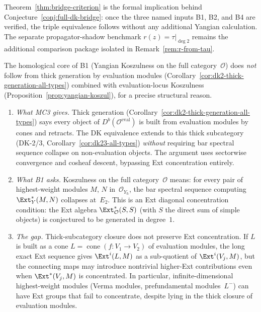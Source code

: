 \begin{remark}
\label{rem:bridge-criterion-application}
Theorem~\ref{thm:bridge-criterion} is the formal implication behind
Conjecture~\ref{conj:full-dk-bridge}: once the three named inputs B1,
B2, and B4 are verified, the triple equivalence follows without any
additional Yangian calculation. The separate propagator-shadow
benchmark $r(z)=\tau|_{\deg 2}$ remains the additional comparison
package isolated in Remark~\ref{rem:r-from-tau}.
\end{remark}

\begin{remark}
\label{rem:b1-obstruction-analysis}
The homological core of B1
\textup{(}Yangian Koszulness on the full
category~$\mathcal{O}$\textup{)} does \emph{not} follow from thick generation by
evaluation modules (Corollary~\ref{cor:dk2-thick-generation-all-types}) combined
with evaluation-locus Koszulness
(Proposition~\ref{prop:yangian-koszul}), for a precise structural reason.

\begin{enumerate}[label=\textup{(\roman*)}]
\item \emph{What MC3 gives.}
 Thick generation (Corollary~\ref{cor:dk2-thick-generation-all-types})
 says every object of
 $D^b(\mathcal{O}^{\mathrm{eval}})$
 is built from evaluation modules by cones and retracts. The DK
 equivalence extends to this thick subcategory (DK-2/3,
 Corollary~\ref{cor:dk23-all-types}) \emph{without} requiring bar
 spectral sequence collapse on non-evaluation objects. The argument
 uses sectorwise convergence and cosheaf descent, bypassing Ext
 concentration entirely.

\item \emph{What B1 asks.}
 Koszulness on the full category~$\mathcal{O}$ means: for every
 pair of highest-weight modules $M$, $N$ in~$\mathcal{O}_{Y_\hbar}$,
 the bar spectral sequence computing $\Ext^*_Y(M, N)$
 collapses at~$E_2$. This is an Ext diagonal concentration
 condition: the Ext algebra
 $\Ext^*_{\mathcal{O}}(S, S)$ (with $S$ the direct sum of simple
 objects) is conjectured to be generated in degree~$1$.

\item \emph{The gap.}
 Thick-subcategory closure does not preserve Ext concentration.
 If $L$ is built as a cone $L = \operatorname{cone}(f\colon V_1 \to V_2)$
 of evaluation modules, the long exact Ext sequence gives
 $\Ext^i(L, M)$ as a sub-quotient of $\Ext^i(V_j, M)$,
 but the connecting maps may introduce nontrivial higher-Ext
 contributions even when $\Ext^*(V_j, M)$ is concentrated. In
 particular, infinite-dimensional highest-weight modules (Verma
 modules, prefundamental modules~$L^-$) can have Ext groups that
 fail to concentrate, despite lying in the thick closure of
 evaluation modules.


\end{enumerate}
\end{remark}
